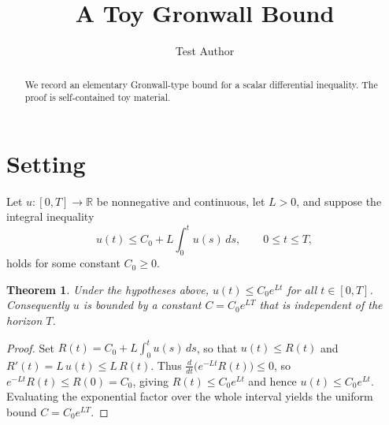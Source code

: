 \documentclass{article}
\newtheorem{theorem}{Theorem}
\begin{document}
\title{A Toy Gronwall Bound}
\author{Test Author}
\maketitle

\begin{abstract}
We record an elementary Gronwall-type bound for a scalar differential
inequality. The proof is self-contained toy material.
\end{abstract}

\section{Setting}
Let $u : [0, T] \to \mathbb{R}$ be nonnegative and continuous, let $L > 0$, and
suppose the integral inequality
\begin{equation}
\label{eq:gronwall-hyp}
u(t) \le C_0 + L \int_0^t u(s) \, ds, \qquad 0 \le t \le T,
\end{equation}
holds for some constant $C_0 \ge 0$.

\begin{theorem}
\label{thm:gronwall}
Under the hypotheses above, $u(t) \le C_0 e^{L t}$ for all $t \in [0, T]$.
Consequently $u$ is bounded by a constant $C = C_0 e^{L T}$ that is
independent of the horizon $T$.
\end{theorem}

\begin{proof}
Set $R(t) = C_0 + L \int_0^t u(s)\, ds$, so that $u(t) \le R(t)$ and
$R'(t) = L\, u(t) \le L\, R(t)$. Thus $\frac{d}{dt}\big(e^{-Lt} R(t)\big) \le 0$,
so $e^{-Lt} R(t) \le R(0) = C_0$, giving $R(t) \le C_0 e^{Lt}$ and hence
$u(t) \le C_0 e^{L t}$. Evaluating the exponential factor over the whole
interval yields the uniform bound $C = C_0 e^{L T}$.
\end{proof}
\end{document}
